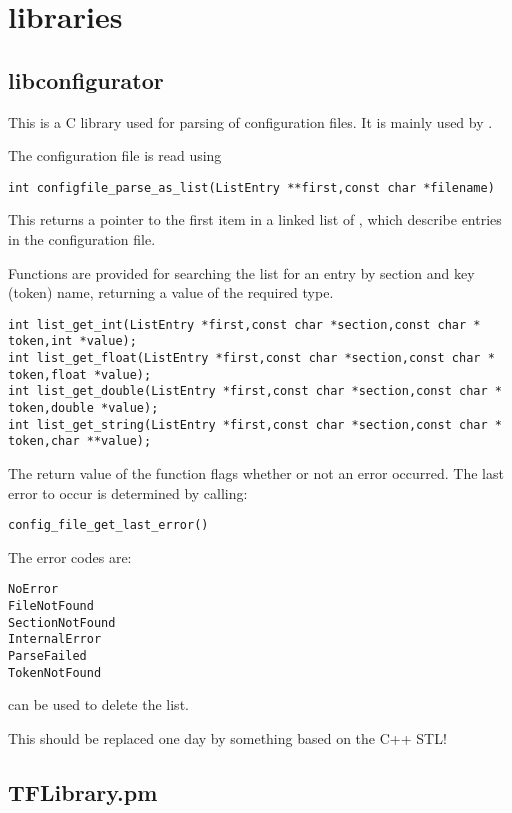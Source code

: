 
\section{libraries}

\subsection{libconfigurator}

This is a C library used for parsing of configuration files. 
It is mainly used by .

The configuration file is read using
\begin{lstlisting}
int configfile_parse_as_list(ListEntry **first,const char *filename)
\end{lstlisting}
This returns a pointer to the first item in a linked list of , which describe entries in the configuration file.

Functions are provided for searching the list for an entry by section and key (token) name, returning a value of the
required type.  

\begin{lstlisting}
int list_get_int(ListEntry *first,const char *section,const char * token,int *value);
int list_get_float(ListEntry *first,const char *section,const char * token,float *value);
int list_get_double(ListEntry *first,const char *section,const char * token,double *value);
int list_get_string(ListEntry *first,const char *section,const char * token,char **value);
\end{lstlisting}

The return value of the function flags whether or not an error occurred.
The last error to occur is determined by calling:
\begin{lstlisting}
config_file_get_last_error()
\end{lstlisting}

The error codes are:
\begin{lstlisting}
NoError
FileNotFound
SectionNotFound
InternalError
ParseFailed
TokenNotFound
\end{lstlisting}

 can be used to delete the list.

This should be replaced one day by something based on the C++ STL!

\subsection{TFLibrary.pm}

